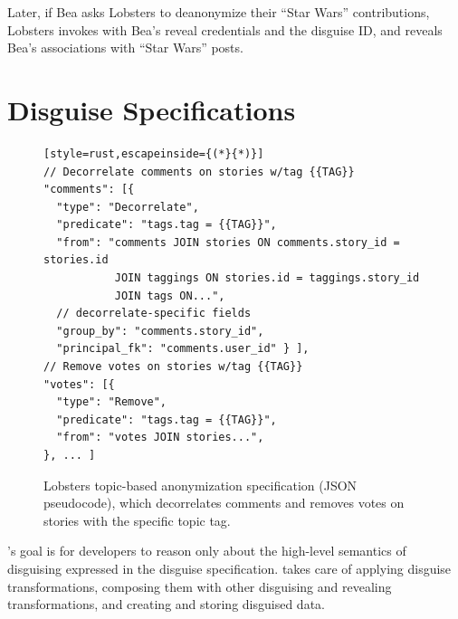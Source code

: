 %
Later, if Bea asks Lobsters to deanonymize their ``Star Wars'' contributions, Lobsters
invokes \sys with Bea's reveal credentials and the disguise ID, and \sys reveals
Bea's associations with ``Star Wars'' posts.
%


\section{Disguise Specifications}
\label{s:spec}

\begin{figure}[t]
\centering
\begin{lstlisting}[style=rust,escapeinside={(*}{*)}]
// Decorrelate comments on stories w/tag {{TAG}}
"comments": [{
  "type": "Decorrelate",
  "predicate": "tags.tag = {{TAG}}",
  "from": "comments JOIN stories ON comments.story_id = stories.id
           JOIN taggings ON stories.id = taggings.story_id
           JOIN tags ON...",
  // decorrelate-specific fields 
  "group_by": "comments.story_id",
  "principal_fk": "comments.user_id" } ],
// Remove votes on stories w/tag {{TAG}}
"votes": [{
  "type": "Remove",
  "predicate": "tags.tag = {{TAG}}",
  "from": "votes JOIN stories...",
}, ... ]
\end{lstlisting}
    \caption[Lobsters topic-based anonymization disguise specification.]{Lobsters topic-based anonymization \xx specification (JSON
    pseudocode), which decorrelates comments and removes votes on stories with
    the specific topic tag.}
\label{f:spec}
\end{figure}


\sys's goal is for developers to reason only about the high-level semantics of
disguising expressed in the disguise specification. \sys takes care of applying
disguise transformations, composing them with other disguising and revealing
transformations, and creating and storing disguised data.


